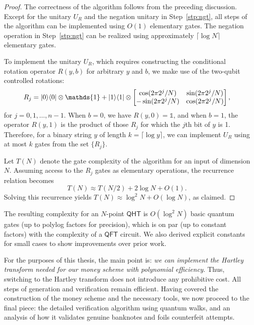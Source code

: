 \documentclass[12pt]{report}
\newcommand{\qht}{\mathsf{QHT}}
\newcommand{\qft}{\mathsf{QFT}}
\begin{document}
\begin{proof}
    The correctness of the algorithm follows from the preceding discussion. Except for the unitary \( U_R \) and the negation unitary in Step~\ref{stp:ngt}, all steps of the algorithm can be implemented using \( O(1) \) elementary gates. The negation operation in Step~\ref{stp:ngt} can be realized using approximately \( \lceil \log N \rceil \) elementary gates.
    
    To implement the unitary \( U_R \), which requires constructing the conditional rotation operator \( R(y, b) \) for arbitrary \( y \) and \( b \), we make use of the two-qubit controlled rotations:
    \[ R_j = \ket{0}\bra{0} \otimes \mathds{1} + \ket{1}\bra{1} \otimes
        \begin{bmatrix}
            \cos(2\pi 2^j / N) & \sin(2\pi 2^j / N) \\
            -\sin(2\pi 2^j / N) & \cos(2\pi 2^j / N)
        \end{bmatrix},
    \]
    for \( j = 0, 1, \dots, n - 1 \). When \( b = 0 \), we have \( R(y, 0) = \mathds{1} \), and when \( b = 1 \), the operator \( R(y, 1) \) is the product of those \( R_j \) for which the \( j \)th bit of \( y \) is 1. Therefore, for a binary string \( y \) of length \( k = \lceil \log y \rceil \), we can implement \( U_R \) using at most \( k \) gates from the set \( \{R_j\} \).
    
    Let \( T(N) \) denote the gate complexity of the algorithm for an input of dimension \( N \). Assuming access to the \( R_j \) gates as elementary operations, the recurrence relation becomes
    \[
    T(N) \approx T(N / 2) + 2\log N + O(1).
    \]
    Solving this recurrence yields \( T(N) \approx \log^2 N + O(\log N) \), as claimed.
    \end{proof}


The resulting complexity for an $N$-point $\qht$ is $O(\log^2 N)$ basic quantum gates (up to polylog factors for precision), which is on par (up to constant factors) with the complexity of a $\qft$ circuit. We also derived explicit constants for small cases to show improvements over prior work.

For the purposes of this thesis, the main point is: \emph{we can implement the Hartley transform needed for our money scheme with polynomial efficiency}. Thus, switching to the Hartley transform does not introduce any prohibitive cost. All steps of generation and verification remain efficient. Having covered the construction of the money scheme and the necessary tools, we now proceed to the final piece: the detailed verification algorithm using quantum walks, and an analysis of how it validates genuine banknotes and foils counterfeit attempts.
\vspace{1em}
\end{document}
